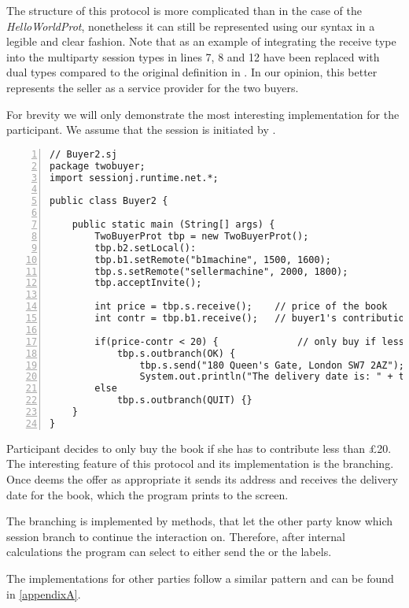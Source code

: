 The structure of this protocol is more complicated than in the case of the \textit{HelloWorldProt}, nonetheless it can still be represented using our syntax in a legible and clear fashion. Note that as an example of integrating the receive type into the multiparty session types in lines 7, 8 and 12 have been replaced with dual types compared to the original definition in \cite{multiparty_sess_types}. In our opinion, this better represents the seller as a service provider for the two buyers.  

For brevity we will only demonstrate the most interesting implementation for the  participant. We assume that the session is initiated by . 

\begin{lstlisting}[basicstyle=\LISTINGSTYLE, numbers=left, caption=Implementation of the \textit{buyer2} participant]
// Buyer2.sj
package twobuyer; 
import sessionj.runtime.net.*;
 
public class Buyer2 {
	
	public static main (String[] args) {
		TwoBuyerProt tbp = new TwoBuyerProt();
		tbp.b2.setLocal():
		tbp.b1.setRemote("b1machine", 1500, 1600);
		tbp.s.setRemote("sellermachine", 2000, 1800);
		tbp.acceptInvite();
		
		int price = tbp.s.receive(); 	// price of the book
		int contr = tbp.b1.receive();	// buyer1's contribution
					
		if(price-contr < 20) {				// only buy if less than 20 pounds needed from me 				
			tbp.s.outbranch(OK) {
				tbp.s.send("180 Queen's Gate, London SW7 2AZ");
				System.out.println("The delivery date is: " + tbp.s.receive()); }
		else
			tbp.s.outbranch(QUIT) {}				
	} 
}
\end{lstlisting}

Participant  decides to only buy the book if she has to contribute less than \pounds 20. The interesting feature of this protocol and its implementation is the branching. Once  deems the offer as appropriate it sends its address and receives the delivery date for the book, which the program prints to the screen.

The branching is implemented by  methods, that let the other party know which session branch to continue the interaction on. Therefore, after internal calculations the program can select to either send the  or the  labels.  

The implementations for other parties follow a similar pattern and can be found in \autoref{appendixA}.